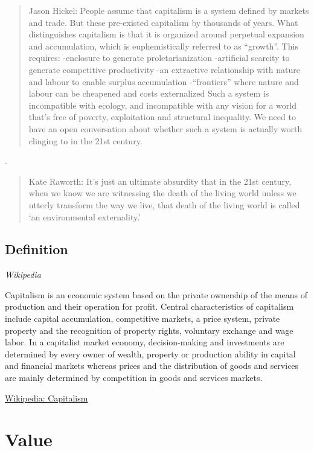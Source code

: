 \documentclass[
]{book}
\begin{document}
\begin{quote}
Jason Hickel: People assume that capitalism is a system
defined by markets and trade.
But these pre-existed capitalism by thousands of years.
What distinguishes capitalism is that it is organized around
perpetual expansion and accumulation,
which is euphemistically referred to as ``growth''.
This requires:
-enclosure to generate proletarianization
-artificial scarcity to generate competitive productivity
-an extractive relationship with nature and labour to enable surplus accumulation
-``frontiers'' where nature and labour can be cheapened and costs externalized
Such a system is incompatible with ecology, and incompatible with any vision
for a world that's free of poverty, exploitation and structural inequality.
We need to have an open conversation about whether such a system is actually
worth clinging to in the 21st century.
\end{quote}

.

\begin{quote}
Kate Raworth: It's just an ultimate absurdity that in the 21st century,
when we know we are witnessing the death of the living world
unless we utterly transform the way we live,
that death of the living world is called `an environmental externality.'
\end{quote}

\hypertarget{definition}{%
\section{Definition}\label{definition}}

\emph{Wikipedia}

Capitalism is an economic system based on the private ownership of the means of production and their operation for profit.
Central characteristics of capitalism include capital accumulation, competitive markets, a price system, private property and the recognition of property rights, voluntary exchange and wage labor.
In a capitalist market economy, decision-making and investments are determined by every owner of wealth, property or production ability in capital and financial markets whereas prices and the distribution of goods and services are mainly determined by competition in goods and services markets.

\href{https://en.wikipedia.org/wiki/Capitalism}{Wikipedia: Capitalism}

\hypertarget{value}{%
\chapter{Value}\label{value}}
\end{document}
